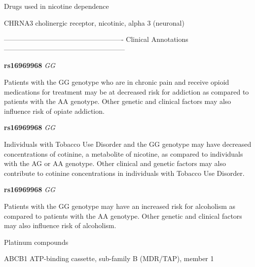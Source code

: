 \documentclass{resume} %
\begin{document}
\begin{rSection}{ Drugs used in nicotine dependence }
\begin{rSubsection}{ CHRNA3 }{ cholinergic receptor, nicotinic, alpha 3 (neuronal) }{}{}
\item[] ---------------------------------------------------- Clinical Annotations -----------------------------------------------------\newline
\item \textbf{ rs16969968 } \textit{ GG }
\item[] Patients with the GG genotype who are in chronic pain and receive opioid medications for treatment may be at decreased risk for addiction as compared to patients with the AA genotype. Other genetic and clinical factors may also influence risk of opiate addiction.\item \textbf{ rs16969968 } \textit{ GG }
\item[] Individuals with Tobacco Use Disorder and the GG genotype may have decreased concentrations of cotinine, a metabolite of nicotine, as compared to individuals with the AG or AA genotype. Other clinical and genetic factors may also contribute to cotinine concentrations in individuals with Tobacco Use Disorder.\item \textbf{ rs16969968 } \textit{ GG }
\item[] Patients with the GG genotype may have an increased risk for alcoholism as compared to patients with the AA genotype. Other genetic and clinical factors may also influence risk of alcoholism.
\end{rSubsection}

\end{rSection}\begin{rSection}{ Platinum compounds }
\item[]

\begin{rSubsection}{ ABCB1 }{ ATP-binding cassette, sub-family B (MDR/TAP), member 1 }{}{}
\item[]


\end{rSubsection}
\end{rSection}
\end{document}
